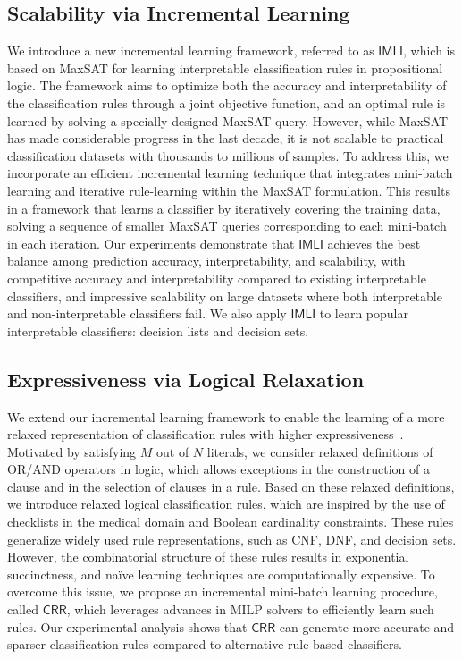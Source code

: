 \documentclass{article}
\begin{document}
\subsection*{Scalability via Incremental Learning}
We introduce a new incremental learning framework, referred to as $\mathsf{IMLI}$, which is based on MaxSAT for learning interpretable classification rules in propositional logic. The framework aims to optimize both the accuracy and interpretability of the classification rules through a joint objective function, and an optimal rule is learned by solving a specially designed MaxSAT query. However, while MaxSAT has made considerable progress in the last decade, it is not scalable to practical classification datasets with thousands to millions of samples. To address this, we incorporate an efficient incremental learning technique that integrates mini-batch learning and iterative rule-learning within the MaxSAT formulation. This results in a framework that learns a classifier by iteratively covering the training data, solving a sequence of smaller MaxSAT queries corresponding to each mini-batch in each iteration. Our experiments demonstrate that $\mathsf{IMLI}$ achieves the best balance among prediction accuracy, interpretability, and scalability, with competitive accuracy and interpretability compared to existing interpretable classifiers, and impressive scalability on large datasets where both interpretable and non-interpretable classifiers fail. We also apply $\mathsf{IMLI}$ to learn popular interpretable classifiers: decision lists and decision sets.

\subsection*{Expressiveness via Logical Relaxation}
We extend our incremental learning framework to enable the learning of a more relaxed representation of classification rules with higher expressiveness~\cite{ghosh2020classification}. Motivated by satisfying $ M $ out of $ N $ literals, we consider relaxed definitions of OR/AND operators in logic, which allows exceptions in the construction of a clause and in the selection of clauses in a rule. Based on these relaxed definitions, we introduce relaxed logical classification rules, which are inspired by the use of checklists in the medical domain and Boolean cardinality constraints. These rules generalize widely used rule representations, such as CNF, DNF, and decision sets. However, the combinatorial structure of these rules results in exponential succinctness, and na\"ive learning techniques are computationally expensive. To overcome this issue, we propose an incremental mini-batch learning procedure, called $\mathsf{CRR}$, which leverages advances in MILP solvers to efficiently learn such rules. Our experimental analysis shows that $\mathsf{CRR}$ can generate more accurate and sparser classification rules compared to alternative rule-based classifiers.
\end{document}
